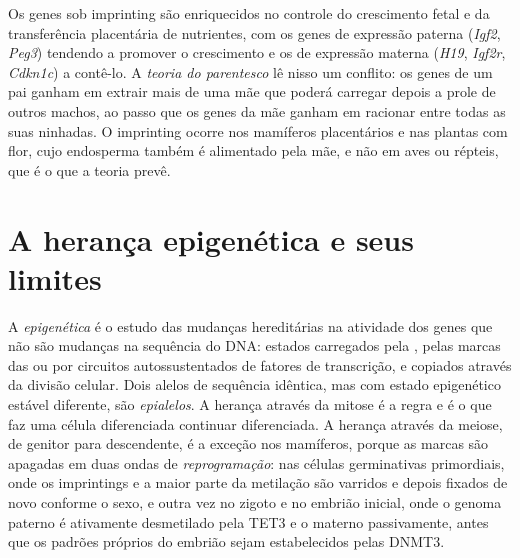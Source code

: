 \begin{remark}\label{rem:b3:chromatin-epigenetics:kinship}
Os genes sob imprinting são enriquecidos no controle do crescimento
fetal e da transferência placentária de nutrientes, com os genes de
expressão paterna (\emph{Igf2}, \emph{Peg3}) tendendo a promover o
crescimento e os de expressão materna (\emph{H19}, \emph{Igf2r},
\emph{Cdkn1c}) a contê-lo. A \emph{teoria do parentesco} lê nisso um
conflito: os genes de um pai ganham em extrair mais de uma mãe que
poderá carregar depois a prole de outros machos, ao passo que os genes
da mãe ganham em racionar entre todas as suas ninhadas. O imprinting
ocorre nos mamíferos placentários e nas plantas com flor, cujo
endosperma também é alimentado pela mãe, e não em aves ou répteis, que
é o que a teoria prevê.
\end{remark}

\section{A herança epigenética e seus limites}

\begin{definition}[Epigenética]\label{def:b3:chromatin-epigenetics:epigenetics}
A \emph{epigenética} é o estudo das mudanças hereditárias na atividade
dos genes que não são mudanças na sequência do DNA: estados
carregados pela , pelas marcas das  ou por
circuitos autossustentados de fatores de transcrição, e copiados
através da divisão celular. Dois alelos de sequência idêntica, mas com
estado epigenético estável diferente, são \emph{epialelos}. A herança
através da mitose é a regra e é o que faz uma célula diferenciada
continuar diferenciada. A herança através da meiose, de genitor para
descendente, é a exceção nos mamíferos, porque as marcas são apagadas
em duas ondas de \emph{reprogramação}: nas células germinativas
primordiais, onde os imprintings e a maior parte da metilação são
varridos e depois fixados de novo conforme o sexo, e outra vez no
zigoto e no embrião inicial, onde o genoma paterno é ativamente
desmetilado pela TET3 e o materno passivamente, antes que os padrões
próprios do embrião sejam estabelecidos pelas DNMT3.
\end{definition}

